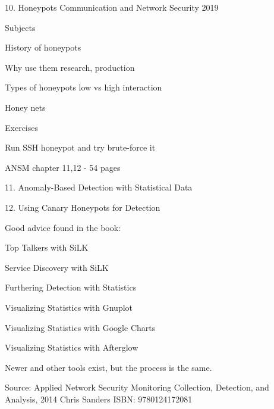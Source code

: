 \documentclass[Screen16to9,17pt]{foils}
\begin{document}
\mytitlepage
{10. Honeypots}
{Communication and Network Security 2019}




\begin{list1}
\item Subjects
\begin{list2}
\item History of honeypots
\item Why use them research, production
\item Types of honeypots low vs high interaction
\item Honey nets
\end{list2}
\item Exercises
\begin{list2}
\item Run SSH honeypot and try brute-force it
\end{list2}
\end{list1}



\begin{list1}
\item ANSM chapter 11,12 - 54 pages
\item 11. Anomaly-Based Detection
with Statistical Data
\item 12. Using Canary Honeypots
for Detection
\end{list1}



Good advice found in the book:
\begin{list2}
\item Top Talkers with SiLK
\item Service Discovery with SiLK
\item Furthering Detection with Statistics
\item Visualizing Statistics with Gnuplot
\item Visualizing Statistics with Google Charts
\item Visualizing Statistics with Afterglow
\end{list2}

Newer and other tools exist, but the process is the same.

Source: Applied Network Security Monitoring Collection, Detection, and Analysis, 2014 Chris Sanders ISBN: 9780124172081


\end{document}

